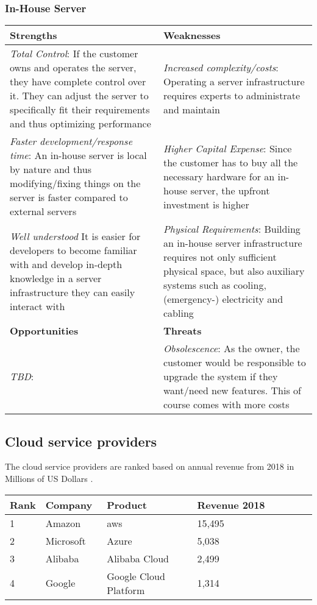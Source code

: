 \subsubsection{In-House Server}

\begin{center}
\begin{tabular}{ | p{0.5\linewidth} | p{0.5\linewidth} | } 
 \hline
 \textbf{Strengths} & \textbf{Weaknesses}\\ 
\hline
 \textit{Total Control}: If the customer owns and operates the server, they have complete control over it. They can adjust the server to specifically fit their requirements and thus optimizing performance & \textit{Increased complexity/costs}: Operating a server infrastructure requires experts to administrate and maintain \\ 
\textit{Faster development/response time}: An in-house server is local by nature and thus modifying/fixing things on the server is faster compared to external servers & \textit{Higher Capital Expense}: Since the customer has to buy all the necessary hardware for an in-house server, the upfront investment is higher \\
\textit{Well understood} It is easier for developers to become familiar with and develop in-depth knowledge in a server infrastructure they can easily interact with & \textit{Physical Requirements}: Building an in-house server infrastructure requires not only sufficient physical space, but also auxiliary systems such as cooling, (emergency-) electricity and cabling \\
 \hline
 \textbf{Opportunities} & \textbf{Threats}  \\ 
 \hline
\textit{TBD}: & \textit{Obsolescence}: As the owner, the customer would be responsible to upgrade the system if they want/need new features. This of course comes with more costs \\
\hline 
\end{tabular}
\end{center}

\subsection{Cloud service providers}
The cloud service providers are ranked based on annual revenue from 2018 in Millions of US Dollars \parencite{iaasrevenue}.
\begin{center}
\begin{tabular}{ | p{0.1\linewidth} | p{0.2\linewidth} | p{0.3\linewidth} | p{0.4\linewidth} |} 
\hline
\textbf{Rank} & \textbf{Company} & \textbf{Product} & \textbf{Revenue 2018} \\ 
\hline
1 & Amazon & \acrshort{aws} & 15,495\\
\hline
2 & Microsoft & Azure & 5,038 \\
\hline
3 & Alibaba & Alibaba Cloud & 2,499 \\
\hline
4 & Google & Google Cloud Platform & 1,314\\
\hline
\end{tabular}
\end{center}

